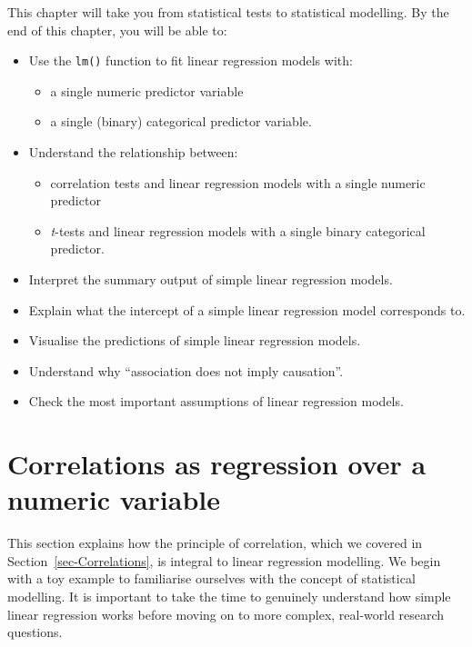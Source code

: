 \documentclass[
  letterpaper,
  DIV=11,
  numbers=noendperiod]{scrreprt}
\providecommand{\tightlist}{%
  \setlength{\itemsep}{0pt}\setlength{\parskip}{0pt}}
\begin{document}
This chapter will take you from statistical tests to statistical
modelling. By the end of this chapter, you will be able to:

\begin{itemize}
\tightlist
\item
  Use the \texttt{lm()} function to fit linear regression models with:

  \begin{itemize}
  \tightlist
  \item
    a single numeric predictor variable
  \item
    a single (binary) categorical predictor variable.
  \end{itemize}
\item
  Understand the relationship between:

  \begin{itemize}
  \tightlist
  \item
    correlation tests and linear regression models with a single numeric
    predictor
  \item
    \emph{t}-tests and linear regression models with a single binary
    categorical predictor.
  \end{itemize}
\item
  Interpret the summary output of simple linear regression models.
\item
  Explain what the intercept of a simple linear regression model
  corresponds to.
\item
  Visualise the predictions of simple linear regression models.
\item
  Understand why ``association does not imply causation''.
\item
  Check the most important assumptions of linear regression models.
\end{itemize}

\section{Correlations as regression over a numeric
variable}\label{sec-Correlationsregression}

This section explains how the principle of correlation, which we covered
in Section~\ref{sec-Correlations}, is integral to linear regression
modelling. We begin with a toy example to familiarise ourselves with the
concept of statistical modelling. It is important to take the time to
genuinely understand how simple linear regression works before moving on
to more complex, real-world research questions.
\end{document}
